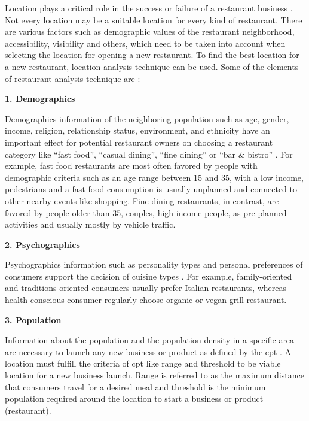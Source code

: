 \documentclass[a4paper, 11pt, oneside]{Thesis}  %
\begin{document}
Location plays a critical role in the success or failure of a restaurant business \cite{Tzeng.2002} \cite{Parsa.2005} \cite{Camillo.2008}. Not every location may be a suitable location for every kind of restaurant. There are various factors such as demographic values of the restaurant neighborhood, accessibility, visibility and others, which need to be taken into account when selecting the location for opening a new restaurant. To find the best location for a new restaurant, location analysis technique can be used. Some of the elements of restaurant analysis technique are \cite{EvanTarver.21.04.2017} \cite{Webstaurantstore.com.25.07.2018}:


 \textbf{1.	Demographics}

Demographics information of the neighboring population such as age, gender, income, religion, relationship status, environment, and ethnicity have an important effect for potential restaurant owners on choosing a restaurant category like “fast food”, “casual dining”, “fine dining” or “bar \& bistro” \cite{EvanTarver.21.04.2017}. For example, fast food restaurants are most often favored by people with demographic criteria such as an age range between 15 and 35, with a low income, pedestrians and a fast food consumption is usually unplanned and connected to other nearby events like shopping. Fine dining restaurants, in contrast, are favored by people older than 35, couples, high income people, as pre-planned activities and usually mostly by vehicle traffic.

\textbf{2.	Psychographics}

Psychographics information such as personality types and personal preferences of consumers support the decision of cuisine types \cite{EvanTarver.21.04.2017}. For example, family-oriented and traditions-oriented consumers usually prefer Italian restaurants, whereas health-conscious consumer regularly choose organic or vegan grill restaurant. 

\textbf{3.	Population}

Information about the population and the population density in a specific area are necessary to launch any new business or product as defined by the \ac{cpt} \cite{Chen.2016}. A location must fulfill the criteria of \ac{cpt} like range and threshold to be viable location for a new business launch. Range is referred to as the maximum distance that consumers travel for a desired meal and threshold is the minimum population required around the location to start a business or product (restaurant).
\end{document}

